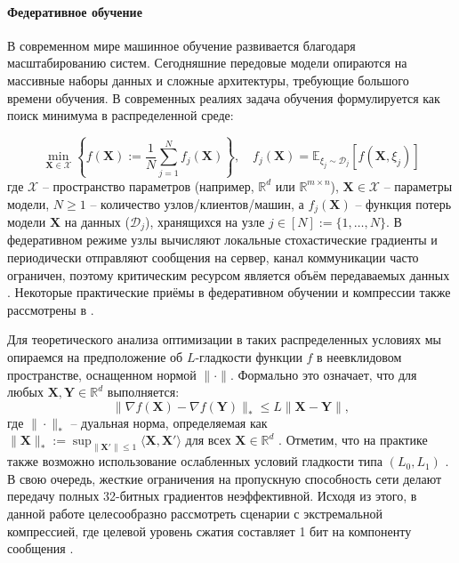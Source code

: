 \documentclass{article}
\begin{document}
\paragraph{Федеративное обучение} В современном мире машинное обучение развивается благодаря масштабированию систем. Сегодняшние передовые модели опираются на массивные наборы данных и сложные архитектуры, требующие большого времени обучения. В современных реалиях задача обучения формулируется как поиск минимума в распределенной среде:


\begin{equation}
\min_{\mathbf{X} \in \mathcal{X}} \left\{ f(\mathbf{X}) := \frac{1}{N}\sum_{j=1}^N f_j(\mathbf{X})\right\}, \quad f_j(\mathbf{X})=\mathbb{E}_{\xi_j\sim \mathcal{D}_j}[f(\mathbf{X},\xi_j)]
\label{fed_eq}
\end{equation}
где $\mathcal{X}$ -- пространство параметров (например, $\mathbb{R}^d$ или $\mathbb{R}^{m \times n}$), $\mathbf{X} \in \mathcal{X}$ -- параметры модели, $N \ge 1$ -- количество узлов/клиентов/машин, а $f_j(\mathbf{X})$ -- функция потерь модели $\mathbf{X}$ на данных ($\mathcal{D}_j$), хранящихся на узле $j \in [N] := \{1, \dots, N\}$. В федеративном режиме узлы вычисляют локальные стохастические градиенты и периодически отправляют сообщения на сервер, канал коммуникации часто ограничен, поэтому критическим ресурсом является объём передаваемых данных \cite{bernstein2019signsgdmajority, horvath2023stochastic}. Некоторые практические приёмы в федеративном обучении и компрессии также рассмотрены в \cite{beznosikov2020biased, gruntkowska2025error, ahn2025dion}.

Для теоретического анализа оптимизации в таких распределенных условиях мы опираемся на предположение об $L$-гладкости функции $f$ в неевклидовом пространстве, оснащенном нормой $\|\cdot\|$. Формально это означает, что для любых $\mathbf{X}, \mathbf{Y} \in \mathbb{R}^d$ выполняется:
\begin{equation}
\|\nabla f(\mathbf{X}) - \nabla f(\mathbf{Y})\|_* \leq L \|\mathbf{X} - \mathbf{Y}\|,
\end{equation}
где $\|\cdot\|_*$ -- дуальная норма, определяемая как $\|\mathbf{X}\|_* := \sup_{\|\mathbf{X}'\| \leq 1} \langle \mathbf{X}, \mathbf{X}' \rangle \text{ для всех } \mathbf{X} \in \mathbb{R}^d$ \cite{kovalev2025understanding}. Отметим, что на практике также возможно использование ослабленных условий гладкости типа $(L_0,L_1)$ \cite{pethick2025generalized}. В свою очередь, жесткие ограничения на пропускную способность сети делают передачу полных 32-битных градиентов неэффективной. Исходя из этого, в данной работе целесообразно рассмотреть сценарии с экстремальной компрессией, где целевой уровень сжатия составляет 1 бит на компоненту сообщения \cite{bernstein2018signsgd, bernstein2019signsgdmajority, beznosikov2020biased}.
\end{document}
